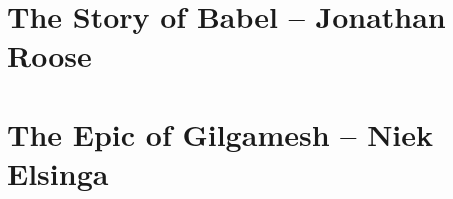 
\section{The Story of Babel -- {\small Jonathan Roose}}

\section{The Epic of Gilgamesh -- {\small Niek Elsinga}}




